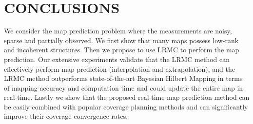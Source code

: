 \section{CONCLUSIONS}
We consider the map prediction problem where the measurements are noisy, sparse and partially observed. We first show that many maps possess low-rank and incoherent structures. Then we propose to use LRMC to perform the map prediction. Our extensive experiments validate that the LRMC method can effectively perform map prediction (interpolation and extrapolation), and the LRMC method outperforms  state-of-the-art Bayesian Hilbert Mapping in terms of mapping accuracy and computation time and could update the entire map in real-time. Lastly we show that the proposed real-time map prediction method can be easily combined with popular coverage planning methods and can significantly improve their coverage convergence rates. %